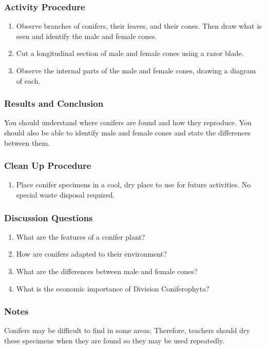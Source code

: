 \subsubsection*{Activity Procedure}
\begin{enumerate}
\item{Observe branches of conifers, their leaves, and their cones. Then draw what is seen and identify the male and female cones.}
\item{Cut a longitudinal section of male and female cones using a razor blade.}
\item{Observe the internal parts of the male and female cones, drawing a diagram of each.}
\end{enumerate}

\subsubsection*{Results and Conclusion}
You should understand where conifers are found and how they reproduce. You should also be able to identify male and female cones and state the differences between them.

\subsubsection*{Clean Up Procedure}
\begin{enumerate}
\item{Place conifer specimens in a cool, dry place to use for future activities. No special waste disposal required.}
\end{enumerate}

\subsubsection*{Discussion Questions}
\begin{enumerate}
\item{What are the features of a conifer plant?}
\item{How are conifers adapted to their environment?}
\item{What are the differences between male and female cones?}
\item{What is the economic importance of Division Coniferophyta?}
\end{enumerate}

\subsubsection*{Notes}
Conifers may be difficult to find in some areas. Therefore, teachers should dry these specimens when they are found so they may be used repeatedly.


